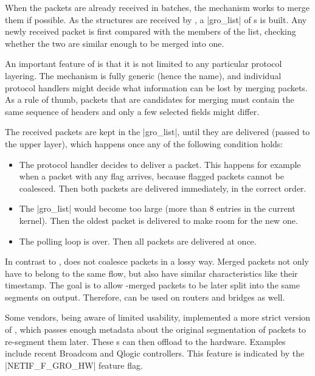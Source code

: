 When the packets are already received in batches, the  mechanism works
to merge them if possible. As the \skb{} structures are received by ,
a \struct|gro_list| of \skb{}s is built. Any newly received packet is first
compared with the members of the list, checking whether the two are similar enough to be
merged into one.

An important feature of  is that it is not limited to any particular
protocol layering. The mechanism is fully generic (hence the name), and
individual protocol handlers might decide what information can be lost by
merging packets. As a rule of thumb, packets that are candidates for merging
must contain the same sequence of headers and only a few selected fields might
differ.

The received packets are kept in the \struct|gro_list|, until they are delivered
(passed to the upper layer), which happens once any of the following condition holds:

\begin{itemize}
	\item The  protocol handler decides to deliver a packet. This happens for example when a 
		packet with any flag arrives, because flagged packets cannot be
		coalesced. Then both packets are delivered immediately, in the correct
		order.
	\item The \struct|gro_list| would become too large (more than 8 entries in
		the current kernel). Then the oldest packet is delivered to make room
		for the new one.
	\item The  polling loop is over. Then all packets are delivered at
		once.
\end{itemize}

In contrast to ,  does not coalesce packets
in a lossy way. Merged packets not only have to belong to the same flow, but
also have similar characteristics like their timestamp. The goal is to allow
-merged packets to be later split into the same segments on output.
Therefore,  can be used on routers and bridges as well.

Some  vendors, being aware of  limited usability, implemented a more
strict version of , which passes enough metadata about the original
segmentation of packets to re-segment them later. These s can then
offload  to the hardware. Examples include recent Broadcom and Qlogic
controllers. This feature is indicated by the \macro|NETIF_F_GRO_HW| feature flag.

